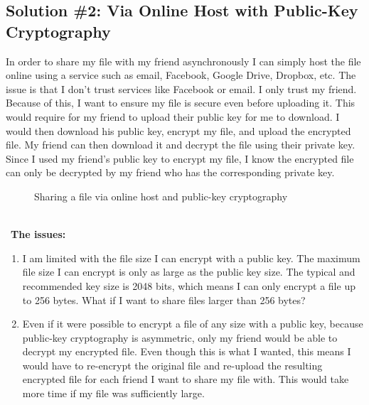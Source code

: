 \documentclass{article}
\begin{document}
\subsection*{Solution \#2: Via Online Host with Public-Key Cryptography}
In order to share my file with my friend asynchronously I can simply host the file online using a service such as email, Facebook, Google Drive, Dropbox, etc. The issue is that I don't trust services like Facebook or email. I only trust my friend. Because of this, I want to ensure my file is secure even before uploading it. This would require for my friend to upload their public key for me to download. I would then download his public key, encrypt my file, and upload the encrypted file. My friend can then download it and decrypt the file using their private key. Since I used my friend's public key to encrypt my file, I know the encrypted file can only be decrypted by my friend who has the corresponding private key.

\begin{figure}[!htb]
        \caption{Sharing a file via online host and public-key cryptography}
\end{figure}


\-\\\ \textbf{The issues:}
\begin{enumerate}
\item I am limited with the file size I can encrypt with a public key. The maximum file size I can encrypt is only as large as the public key size. The typical and recommended key size is 2048 bits, which means I can only encrypt a file up to 256 bytes. What if I want to share files larger than 256 bytes?
\item Even if it were possible to encrypt a file of any size with a public key, because public-key cryptography is asymmetric, only my friend would be able to decrypt my encrypted file. Even though this is what I wanted, this means I would have to re-encrypt the original file and re-upload the resulting encrypted file for each friend I want to share my file with. This would take more time if my file was sufficiently large.
\end{enumerate}
\end{document}
